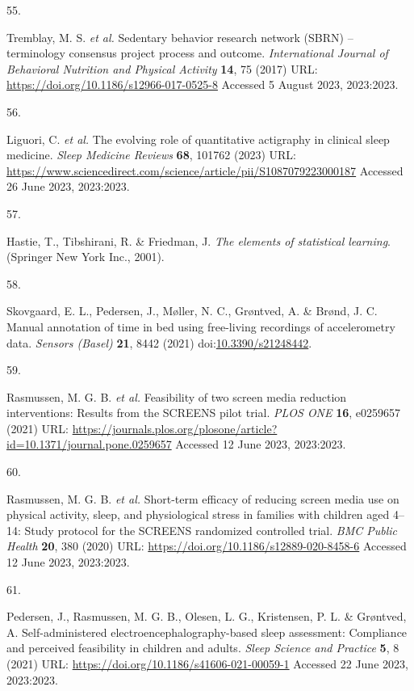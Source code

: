 \documentclass[
  9pt,
]{scrbook}
\newlength{\cslhangindent}
\newlength{\csllabelwidth}
\newlength{\cslentryspacingunit} %
\newenvironment{CSLReferences}[2] %
 {%
  \setlength{\parindent}{0pt}
  \ifodd #1
  \let\oldpar\par
  \def\par{\hangindent=\cslhangindent\oldpar}
  \fi
  \setlength{\parskip}{#2\cslentryspacingunit}
 }%
 {}
\newcommand{\CSLLeftMargin}[1]{\parbox[t]{\csllabelwidth}{#1}}
\newcommand{\CSLRightInline}[1]{\parbox[t]{\linewidth - \csllabelwidth}{#1}\break}
\begin{document}
\begin{CSLReferences}{0}{0}
\leavevmode{}%
\CSLLeftMargin{55. }%
\CSLRightInline{Tremblay, M. S. \emph{et al.} Sedentary behavior
research network ({SBRN}) -- terminology consensus project process and
outcome. \emph{International Journal of Behavioral Nutrition and
Physical Activity} \textbf{14}, 75 (2017) URL:
\url{https://doi.org/10.1186/s12966-017-0525-8} Accessed 5 August 2023,
2023:2023.}

\leavevmode{}%
\CSLLeftMargin{56. }%
\CSLRightInline{Liguori, C. \emph{et al.} The evolving role of
quantitative actigraphy in clinical sleep medicine. \emph{Sleep Medicine
Reviews} \textbf{68}, 101762 (2023) URL:
\url{https://www.sciencedirect.com/science/article/pii/S1087079223000187}
Accessed 26 June 2023, 2023:2023.}

\leavevmode{}%
\CSLLeftMargin{57. }%
\CSLRightInline{Hastie, T., Tibshirani, R. \& Friedman, J. \emph{The
elements of statistical learning}. (Springer New York Inc., 2001).}

\leavevmode{}%
\CSLLeftMargin{58. }%
\CSLRightInline{Skovgaard, E. L., Pedersen, J., Møller, N. C., Grøntved,
A. \& Brønd, J. C. Manual annotation of time in bed using free-living
recordings of accelerometry data. \emph{Sensors (Basel)} \textbf{21},
8442 (2021)
doi:\href{https://doi.org/10.3390/s21248442}{10.3390/s21248442}.}

\leavevmode{}%
\CSLLeftMargin{59. }%
\CSLRightInline{Rasmussen, M. G. B. \emph{et al.} Feasibility of two
screen media reduction interventions: Results from the {SCREENS} pilot
trial. \emph{{PLOS} {ONE}} \textbf{16}, e0259657 (2021) URL:
\url{https://journals.plos.org/plosone/article?id=10.1371/journal.pone.0259657}
Accessed 12 June 2023, 2023:2023.}

\leavevmode{}%
\CSLLeftMargin{60. }%
\CSLRightInline{Rasmussen, M. G. B. \emph{et al.} Short-term efficacy of
reducing screen media use on physical activity, sleep, and physiological
stress in families with children aged 4--14: Study protocol for the
{SCREENS} randomized controlled trial. \emph{{BMC} Public Health}
\textbf{20}, 380 (2020) URL:
\url{https://doi.org/10.1186/s12889-020-8458-6} Accessed 12 June 2023,
2023:2023.}

\leavevmode{}%
\CSLLeftMargin{61. }%
\CSLRightInline{Pedersen, J., Rasmussen, M. G. B., Olesen, L. G.,
Kristensen, P. L. \& Grøntved, A. Self-administered
electroencephalography-based sleep assessment: Compliance and perceived
feasibility in children and adults. \emph{Sleep Science and Practice}
\textbf{5}, 8 (2021) URL:
\url{https://doi.org/10.1186/s41606-021-00059-1} Accessed 22 June 2023,
2023:2023.}


\end{CSLReferences}
\end{document}
